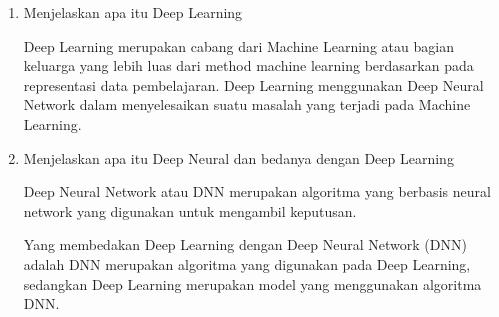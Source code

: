 \begin{enumerate}
\item Menjelaskan apa itu Deep Learning
	\par Deep Learning merupakan cabang dari Machine Learning atau bagian keluarga yang lebih luas dari method machine learning berdasarkan pada representasi data pembelajaran. Deep Learning menggunakan Deep Neural Network dalam menyelesaikan suatu masalah yang terjadi pada Machine Learning.
	
\item Menjelaskan apa itu Deep Neural dan bedanya dengan Deep Learning
	\par Deep Neural Network atau DNN merupakan algoritma yang berbasis neural network yang digunakan untuk mengambil keputusan.
	\par Yang membedakan Deep Learning dengan  Deep Neural Network (DNN) adalah DNN merupakan algoritma yang digunakan pada Deep Learning, sedangkan Deep Learning merupakan model yang menggunakan algoritma DNN.
	

\end{enumerate}
